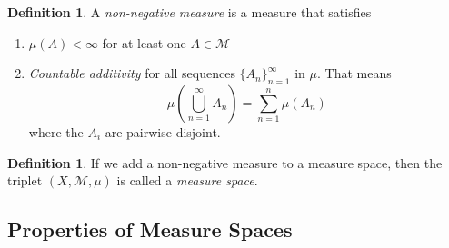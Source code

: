 \documentclass[12pt]{article}
\theoremstyle{plain}
\theoremstyle{definition}
\newtheorem{defn}[thm]{Definition}
\theoremstyle{remark}
\begin{document}
\begin{defn} 
A \emph{non-negative measure} is a measure that satisfies 
\begin{enumerate}
    \item $\mu(A)<\infty$ for at least one $A\in\mathscr{M}$ 
    \item \emph{Countable additivity} for all sequences $\{A_n\}_{n=1}^\infty$ in $\mu$. That means 
        \[
            \mu\left(\bigcup^\infty_{n=1}A_n\right) 
            = \sum^n_{n=1} \mu(A_n)
        \]
        where the $A_i$ are pairwise disjoint.
\end{enumerate}
\end{defn}

\begin{defn} 
If we add a non-negative measure to a measure space, then the triplet $(X,\mathscr{M},\mu)$ is called a \emph{measure space}. 
\end{defn}

\subsection{Properties of Measure Spaces}
\end{document}
